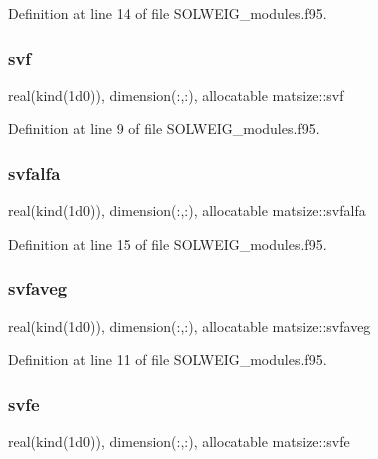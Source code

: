 Definition at line 14 of file S\+O\+L\+W\+E\+I\+G\+\_\+modules.\+f95.

\mbox{\label{namespacematsize_a94334e57071e6a8dc83f66b04f8ea8fe}} 
\subsubsection{\texorpdfstring{svf}{svf}}
{\footnotesize\ttfamily real(kind(1d0)), dimension(\+:,\+:), allocatable matsize\+::svf}



Definition at line 9 of file S\+O\+L\+W\+E\+I\+G\+\_\+modules.\+f95.

\mbox{\label{namespacematsize_a8fd9348664bd661da87ca40af12bed50}} 
\subsubsection{\texorpdfstring{svfalfa}{svfalfa}}
{\footnotesize\ttfamily real(kind(1d0)), dimension(\+:,\+:), allocatable matsize\+::svfalfa}



Definition at line 15 of file S\+O\+L\+W\+E\+I\+G\+\_\+modules.\+f95.

\mbox{\label{namespacematsize_a8d3d2ca849f0c0098a529191de39e6e2}} 
\subsubsection{\texorpdfstring{svfaveg}{svfaveg}}
{\footnotesize\ttfamily real(kind(1d0)), dimension(\+:,\+:), allocatable matsize\+::svfaveg}



Definition at line 11 of file S\+O\+L\+W\+E\+I\+G\+\_\+modules.\+f95.

\mbox{\label{namespacematsize_a890ca1fcc0cc7dce50caad1a19886268}} 
\subsubsection{\texorpdfstring{svfe}{svfe}}
{\footnotesize\ttfamily real(kind(1d0)), dimension(\+:,\+:), allocatable matsize\+::svfe}



